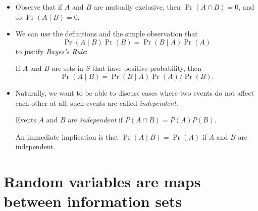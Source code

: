 \begin{itemize}
\item Observe that if $A$ and $B$ are mutually exclusive, then $\Pr(A
  \cap B) = 0$, and so $\Pr(A \mid B) = 0$.

\item We can use the definitions and the simple observation that
  \begin{equation*}
    \Pr(A \mid B) \Pr(B) = \Pr(B \mid A) \Pr(A)
  \end{equation*}
  to justify \emph{Bayes's Rule}:
  \begin{thm}
    If $A$ and $B$ are sets in $S$ that have positive probability, then
    \begin{equation*}
      \Pr(A \mid B) = \Pr(B \mid A) \Pr(A) / \Pr(B).
    \end{equation*}
  \end{thm}

\item Naturally, we want to be able to discuss cases where two events
  do not affect each other at all; such events are called
  \emph{independent}.

  \begin{defn}
    Events $A$ and $B$ are \emph{independent} if $P(A \cap B) = P(A)
    P(B)$.
  \end{defn}

  An immediate implication is that $\Pr(A \mid B) = \Pr(A)$ if $A$ and
  $B$ are independent.

\end{itemize}

\section{Random variables are maps between information sets}

